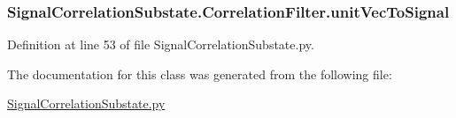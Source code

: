 \subsubsection[{\texorpdfstring{unit\+Vec\+To\+Signal}{unitVecToSignal}}]{\setlength{\rightskip}{0pt plus 5cm}Signal\+Correlation\+Substate.\+Correlation\+Filter.\+unit\+Vec\+To\+Signal}\hypertarget{classSignalCorrelationSubstate_1_1CorrelationFilter_ac1cfe7d60893f6a9e174a775be166fd6}{}\label{classSignalCorrelationSubstate_1_1CorrelationFilter_ac1cfe7d60893f6a9e174a775be166fd6}


Definition at line 53 of file Signal\+Correlation\+Substate.\+py.



The documentation for this class was generated from the following file\+:\begin{DoxyCompactItemize}
\item 
\hyperlink{SignalCorrelationSubstate_8py}{Signal\+Correlation\+Substate.\+py}\end{DoxyCompactItemize}
